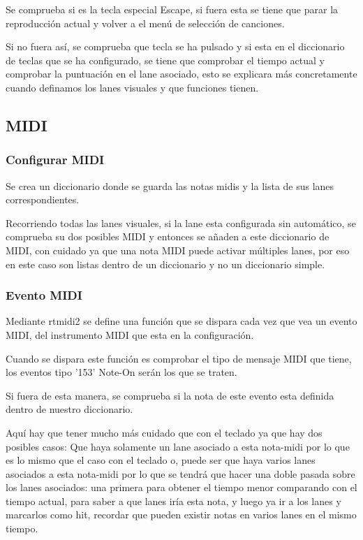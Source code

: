 \documentclass[a4paper,11pt,oneside]{book}
\begin{document}
Se comprueba si es la tecla especial Escape, si fuera esta se tiene que parar la reproducción actual y volver a el menú de selección de canciones.

Si no fuera así, se comprueba que tecla se ha pulsado y si esta en el diccionario de teclas que se ha configurado, se tiene que comprobar el tiempo actual y comprobar la puntuación en el lane asociado, esto se explicara más concretamente cuando definamos los lanes visuales y que funciones tienen.

\subsection{MIDI}
\subsubsection{Configurar MIDI}
Se crea un diccionario donde se guarda las notas midis y la lista de sus lanes correspondientes.

Recorriendo todas las lanes visuales, si la lane esta configurada sin automático, se comprueba su dos posibles MIDI y entonces se añaden a este diccionario de MIDI, con cuidado ya que una nota MIDI puede activar múltiples lanes, por eso en este caso son listas dentro de un diccionario y no un diccionario simple.

\subsubsection{Evento MIDI}
Mediante rtmidi2 se define una función que se dispara cada vez que vea un evento MIDI, del instrumento MIDI que esta en la configuración.

Cuando se dispara este función es comprobar el tipo de mensaje MIDI que tiene, los eventos tipo '153' Note-On serán los que se traten.

Si fuera de esta manera, se comprueba si la nota de este evento esta definida dentro de nuestro diccionario.

Aquí hay que tener mucho más cuidado que con el teclado ya que hay dos posibles casos:
Que haya solamente un lane asociado a esta nota-midi por lo que es lo mismo que el caso con el teclado o, puede ser que haya varios lanes asociados a esta nota-midi por lo que se tendrá que hacer una doble pasada sobre los lanes asociados: una primera para obtener el tiempo menor comparando con el tiempo actual, para saber a que lanes iría esta nota, y luego ya ir a los lanes y marcarlos como hit, recordar que pueden existir notas en varios lanes en el mismo tiempo. 
\end{document}
